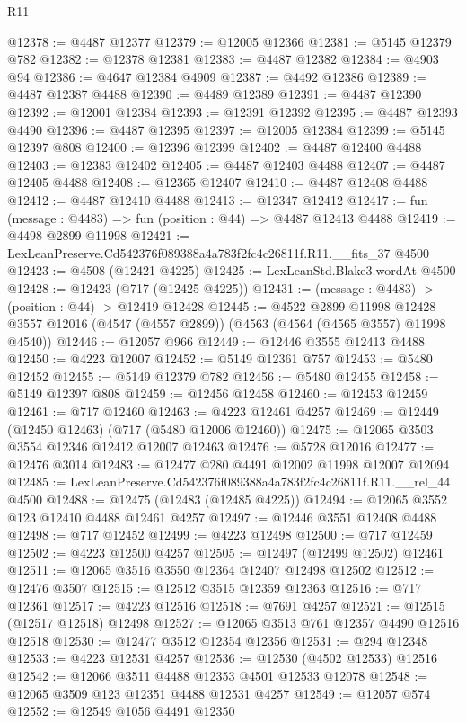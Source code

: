 \begin{lexlean}{R11}
\begin{coremodule}
@12378 := @4487 @12377
@12379 := @12005 @12366
@12381 := @5145 @12379 @782
@12382 := @12378 @12381
@12383 := @4487 @12382
@12384 := @4903 @94
@12386 := @4647 @12384 @4909
@12387 := @4492 @12386
@12389 := @4487 @12387 @4488
@12390 := @4489 @12389
@12391 := @4487 @12390
@12392 := @12001 @12384
@12393 := @12391 @12392
@12395 := @4487 @12393 @4490
@12396 := @4487 @12395
@12397 := @12005 @12384
@12399 := @5145 @12397 @808
@12400 := @12396 @12399
@12402 := @4487 @12400 @4488
@12403 := @12383 @12402
@12405 := @4487 @12403 @4488
@12407 := @4487 @12405 @4488
@12408 := @12365 @12407
@12410 := @4487 @12408 @4488
@12412 := @4487 @12410 @4488
@12413 := @12347 @12412
@12417 := fun (message : @4483) => fun (position : @44) => @4487 @12413 @4488
@12419 := @4498 @2899 @11998
@12421 := LexLeanPreserve.Cd542376f089388a4a783f2fc4c26811f.R11.__fits_37 @4500
@12423 := @4508 (@12421 @4225)
@12425 := LexLeanStd.Blake3.wordAt @4500
@12428 := @12423 (@717 (@12425 @4225))
@12431 := (message : @4483) -> (position : @44) -> @12419 @12428
@12445 := @4522
    @2899
    @11998
    @12428
    @3557
    @12016
    (@4547 (@4557 @2899))
    (@4563 (@4564 (@4565 @3557) @11998 @4540))
@12446 := @12057 @966
@12449 := @12446 @3555 @12413 @4488
@12450 := @4223 @12007
@12452 := @5149 @12361 @757
@12453 := @5480 @12452
@12455 := @5149 @12379 @782
@12456 := @5480 @12455
@12458 := @5149 @12397 @808
@12459 := @12456 @12458
@12460 := @12453 @12459
@12461 := @717 @12460
@12463 := @4223 @12461 @4257
@12469 := @12449 (@12450 @12463) (@717 (@5480 @12006 @12460))
@12475 := @12065 @3503 @3554 @12346 @12412 @12007 @12463
@12476 := @5728 @12016
@12477 := @12476 @3014
@12483 := @12477 @280 @4491 @12002 @11998 @12007 @12094
@12485 := LexLeanPreserve.Cd542376f089388a4a783f2fc4c26811f.R11.__rel_44 @4500
@12488 := @12475 (@12483 (@12485 @4225))
@12494 := @12065 @3552 @123 @12410 @4488 @12461 @4257
@12497 := @12446 @3551 @12408 @4488
@12498 := @717 @12452
@12499 := @4223 @12498
@12500 := @717 @12459
@12502 := @4223 @12500 @4257
@12505 := @12497 (@12499 @12502) @12461
@12511 := @12065 @3516 @3550 @12364 @12407 @12498 @12502
@12512 := @12476 @3507
@12515 := @12512 @3515 @12359 @12363
@12516 := @717 @12361
@12517 := @4223 @12516
@12518 := @7691 @4257
@12521 := @12515 (@12517 @12518) @12498
@12527 := @12065 @3513 @761 @12357 @4490 @12516 @12518
@12530 := @12477 @3512 @12354 @12356
@12531 := @294 @12348
@12533 := @4223 @12531 @4257
@12536 := @12530 (@4502 @12533) @12516
@12542 := @12066 @3511 @4488 @12353 @4501 @12533 @12078
@12548 := @12065 @3509 @123 @12351 @4488 @12531 @4257
@12549 := @12057 @574
@12552 := @12549 @1056 @4491 @12350

\end{coremodule}
\end{lexlean}
